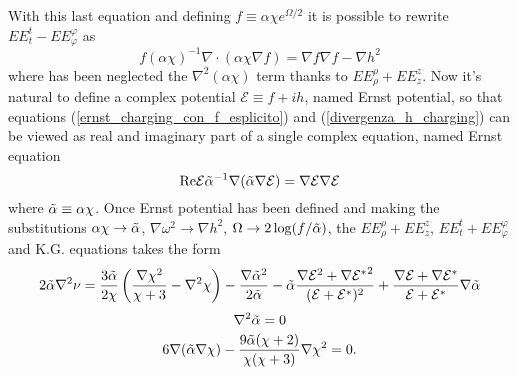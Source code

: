 With this last equation and defining $f \equiv \alpha\chi e^{\Omega /2}$ it is possible to rewrite $EE^t_t- EE^{\varphi}_{\varphi}$ as 
\begin{equation}
        f (\alpha\chi)^{-1}\nabla\cdot(\alpha\chi\nabla f) = \nabla f\nabla f - \nabla h^2
        \label{ernst_charging_con_f_esplicito}
\end{equation}
where has been neglected the $\nabla^2(\alpha\chi)$ term thanks to $EE^{\rho}_{\rho}+EE^{z}_{z}$. Now it's natural to define a complex potential $\mathcal{E} \equiv f + ih$, named Ernst potential, so that equations (\ref{ernst_charging_con_f_esplicito}) and (\ref{divergenza_h_charging}) can be viewed as real and imaginary part of a single complex equation, named Ernst equation 
\begin{equation}
    \mathrm{Re}\mathcal{E}\Tilde{\alpha}^{-1}\nabla(\Tilde{\alpha}\nabla\mathcal{E})=\nabla\mathcal{E}\nabla\mathcal{E}
    \label{Ernst_CC_charging}
\end{equation}
where $\Tilde{\alpha}\equiv \alpha\chi$. 
Once Ernst potential has been defined and making the substitutions $\alpha\chi \rightarrow \Tilde{\alpha}$, $\nabla\omega^2 \rightarrow \nabla h^2$, $\Omega\rightarrow 2\log(f/\Tilde{\alpha})$, the $EE^{\rho}_{\rho}+EE^{z}_{z}$, $EE^t_t+ EE^{\varphi}_{\varphi}$ and K.G. equations takes the form
\begin{equation}
    2\Tilde{\alpha}\nabla^2\nu = \frac{3\Tilde{\alpha}}{2\chi}\left(\frac{\nabla\chi^2}{\chi +3} - \nabla^2\chi \right) - \frac{\nabla\Tilde{\alpha}^2}{2\Tilde{\alpha}} - \Tilde{\alpha}\frac{\nabla\mathcal{E}^2 + {\nabla\mathcal{E}^*}^2}{(\mathcal{E} + \mathcal{E}^*)^2} + \frac{\nabla\mathcal{E} + \nabla\mathcal{E}^*}{\mathcal{E} + \mathcal{E}^*}\nabla\Tilde{\alpha} 
    \label{equazione_per_nu_ernst_charging}
\end{equation}
\begin{equation}
    \nabla^2\Tilde{\alpha}=0 
    \label{laplaciano_nullo}
\end{equation}
\begin{equation}
    6\nabla(\Tilde{\alpha}\nabla\chi) - \frac{9\Tilde{\alpha}(\chi +2)}{\chi(\chi + 3)}\nabla\chi^2 = 0 .
    \label{K.G._ernst_charging}
\end{equation}
\vspace{-3em}

